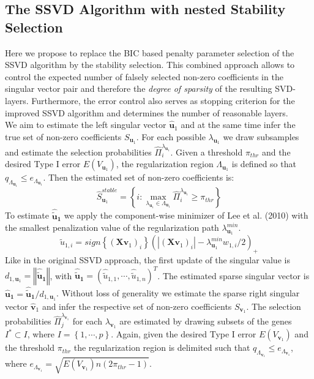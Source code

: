 \documentclass{bioinfo}
\begin{document}
\begin{methods}
\subsection{The SSVD Algorithm with nested Stability Selection}
Here we propose to replace the BIC based penalty parameter selection of the SSVD algorithm by the stability selection. 
This combined approach allows to control the expected number of falsely selected non-zero coefficients in the singular vector pair and therefore the \textit{degree of sparsity} of the resulting SVD-layers. Furthermore, the error control also serves as stopping criterion for the improved SSVD algorithm and determines the number of reasonable layers. \\
We aim to estimate the left singular vector $\mathbf{\hat{u}}_{1}$ and at the same time infer the true set of non-zero coefficients $S_{\mathbf{u}_{1}}$.
For each possible $\lambda_{\mathbf{u}_{1}}$ we draw subsamples and estimate the selection probabilities $\hat{\Pi}_{i}^{\lambda_{\mathbf{u}_{1}}}$.
Given a threshold $\pi_{thr}$ and the desired Type I error $E(V_{\mathbf{u}_{1}})$, the regularization region $\Lambda_{\mathbf{u}_{1}}$ is defined so that $q_{\Lambda_{\mathbf{u}_{1}}} \leq e_{\Lambda_{\mathbf{u}_{1}}}$.
Then the estimated set of non-zero coefficients is:\\
\begin{equation}
\hat{S}_{\mathbf{u}_{1}}^{stable}=\left\{i: \max_{\lambda_{\mathbf{u}_{1}} \in \Lambda_{\mathbf{u}_{1}}} \hat{\Pi}_{i}^{\lambda_{\mathbf{u}_{1}}} \geq \pi_{thr} \right\}
\end{equation}
To estimate $\mathbf{\hat{\tilde{u}}_{1}}$ we apply the component-wise minimizer of Lee et al. (2010) with the smallest penalization value of the regularization path $\lambda_{\mathbf{u}_{1}}^{min}$.
\begin{equation}
\hat{\tilde{u}}_{1,i}=\textit{sign} \left\{(\mathbf{X}\mathbf{v}_{1})_{i} \right\} (|(\mathbf{X}\mathbf{v}_{1})_{i}|- \lambda^{min}_{\mathbf{u}_{1}}w_{1,i}/2)_{+} 
\end{equation}
Like in the original SSVD approach, the first update of the singular value is $d_{1,\mathbf{u}_{1}}=\left\Vert\mathbf{\hat{\tilde{u}}_{1}}\right\Vert$, with 
$\mathbf{\hat{\tilde{u}}_{1}}=(\hat{\tilde{u}}_{1,1},\cdots,\hat{\tilde{u}}_{1,n})^{T}$. The estimated sparse singular vector is  $\mathbf{\hat{u}_{1}}=\mathbf{\hat{\tilde{u}}_{1}}/d_{1,\mathbf{u}_{1}}$.
Without loss of generality we estimate the sparse right singular vector $\mathbf{\hat{v}}_{1}$ and infer the respective set of non-zero coefficients $S_{\mathbf{v}_{1}}$. The selection probabilities $\hat{\Pi}_{j}^{\lambda_{\mathbf{v}_{1}}}$ for each $\lambda_{\mathbf{v}_{1}}$ are estimated by drawing subsets of the genes $I^{*} \subset I$, where $I=\left\{1,\cdots,p \right\}$. Again, given the desired Type I error $E(V_{\mathbf{v}_{1}})$ and the threshold $\pi_{thr}$ the regularization region is delimited such that $q_{\Lambda_{\mathbf{v}_{1}}} \leq e_{\Lambda_{\mathbf{v}_{1}}}$, where $e_{\Lambda_{\mathbf{v}_{1}}}= \sqrt{E(V_{\mathbf{v}_{1}})n(2\pi_{thr}-1)}$. 

\end{methods}
\end{document}
